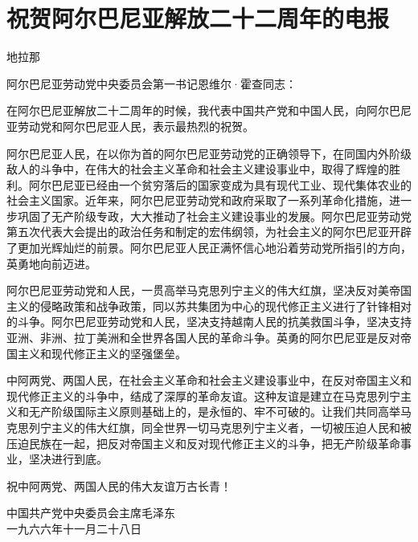 \section[祝贺阿尔巴尼亚解放二十二周年的电报（一九六六年十一月二十八日）]{祝贺阿尔巴尼亚解放二十二周年的电报}


地拉那

阿尔巴尼亚劳动党中央委员会第一书记恩维尔·霍查同志：

在阿尔巴尼亚解放二十二周年的时候，我代表中国共产党和中国人民，向阿尔巴尼亚劳动党和阿尔巴尼亚人民，表示最热烈的祝贺。

阿尔巴尼亚人民，在以你为首的阿尔巴尼亚劳动党的正确领导下，在同国内外阶级敌人的斗争中，在伟大的社会主义革命和社会主义建设事业中，取得了辉煌的胜利。阿尔巴尼亚已经由一个贫穷落后的国家变成为具有现代工业、现代集体农业的社会主义国家。近年来，阿尔巴尼亚劳动党和政府采取了一系列革命化措施，进一步巩固了无产阶级专政，大大推动了社会主义建设事业的发展。阿尔巴尼亚劳动党第五次代表大会提出的政治任务和制定的宏伟纲领，为社会主义的阿尔巴尼亚开辟了更加光辉灿烂的前景。阿尔巴尼亚人民正满怀信心地沿着劳动党所指引的方向，英勇地向前迈进。

阿尔巴尼亚劳动党和人民，一贯高举马克思列宁主义的伟大红旗，坚决反对美帝国主义的侵略政策和战争政策，同以苏共集团为中心的现代修正主义进行了针锋相对的斗争。阿尔巴尼亚劳动党和人民，坚决支持越南人民的抗美救国斗争，坚决支持亚洲、非洲、拉丁美洲和全世界各国人民的革命斗争。英勇的阿尔巴尼亚是反对帝国主义和现代修正主义的坚强堡垒。

中阿两党、两国人民，在社会主义革命和社会主义建设事业中，在反对帝国主义和现代修正主义的斗争中，结成了深厚的革命友谊。这种友谊是建立在马克思列宁主义和无产阶级国际主义原则基础上的，是永恒的、牢不可破的。让我们共同高举马克思列宁主义的伟大红旗，同全世界一切马克思列宁主义者，一切被压迫人民和被压迫民族在一起，把反对帝国主义和反对现代修正主义的斗争，把无产阶级革命事业，坚决进行到底。

祝中阿两党、两国人民的伟大友谊万古长青！
{\raggedleft 中国共产党中央委员会主席毛泽东\\一九六六年十一月二十八日\par}


